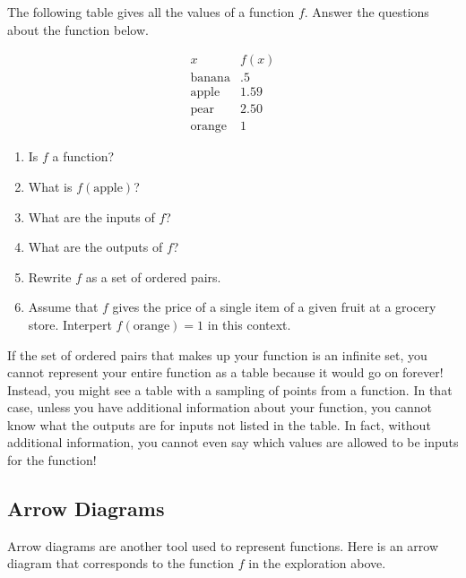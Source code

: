 \documentclass{ximera}
\begin{document}
\begin{exploration}
The following table gives all the values of a function $f$.  Answer the questions about the function below.

$$
\begin{array}{cc}
x & f(x) \\
\hline
\text{banana}&.5\\
\text{apple}&1.59\\
\text{pear}&2.50\\
\text{orange}&1
\end{array}
$$

\begin{enumerate}[label=\alph*.]
\item Is $f$ a function? 
\item What is $f(\text{apple})$?
\item  What are the inputs of $f$?
\item  What are the outputs of $f$?
\item Rewrite $f$ as a set of ordered pairs.
\item  Assume that $f$ gives the price of a single item of a given fruit at a grocery store.  Interpert $f(\text{orange})=1$ in this context.
\end{enumerate}
\end{exploration}

If the set of ordered pairs that makes up your function is an infinite set, you cannot represent your entire function as a table because it would go on forever!  Instead, you might see a table with a sampling of points from a function. In that case, unless you have additional information about your function, you cannot know what the outputs are for inputs not listed in the table.  In fact, without additional information, you cannot even say which values are allowed to be inputs for the function!

\subsection{Arrow Diagrams}
Arrow diagrams are another tool used to represent functions.  Here is an arrow diagram that corresponds to the function $f$ in the exploration above.
\end{document}
